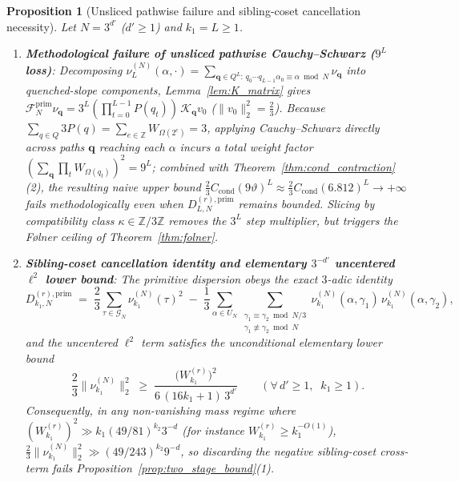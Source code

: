 \documentclass[11pt,a4paper]{article}
\numberwithin{equation}{section}
\newtheorem{proposition}[theorem]{Proposition}
\theoremstyle{definition}
\theoremstyle{remark}
\newcommand{\Z}{\mathbb{Z}}
\newcommand{\cG}{\mathcal{G}}
\newcommand{\cF}{\mathcal{F}}
\newcommand{\cK}{\mathcal{K}}
\newcommand{\prim}{\mathrm{prim}}
\begin{document}
\begin{proposition}[Unsliced pathwise failure and sibling-coset cancellation necessity]\label{prop:unsliced_sibling}
Let $N = 3^{d'}$ ($d' \ge 1$) and $k_1 = L \ge 1$.
\begin{enumerate}[label=(\arabic*)]
\item \textbf{Methodological failure of unsliced pathwise Cauchy--Schwarz ($9^L$ loss)}: Decomposing $\nu_L^{(N)}(\alpha, \cdot) = \sum_{\boldsymbol{q}\in Q^L:\, q_0\cdots q_{L-1}\alpha_0 \equiv \alpha \bmod N} \nu_{\boldsymbol{q}}$ into quenched-slope components, Lemma~\ref{lem:K_matrix} gives $\cF_N^{\prim}\nu_{\boldsymbol{q}} = 3^L(\prod_{t=0}^{L-1} P(q_t))\,\cK_{\boldsymbol{q}} v_0$ ($\|v_0\|_2^2 = \frac{2}{3}$). Because $\sum_{q \in Q} 3 P(q) = \sum_{e \in \Z} W_{\Omega(2^e)} = 3$, applying Cauchy--Schwarz directly across paths $\boldsymbol{q}$ reaching each $\alpha$ incurs a total weight factor $(\sum_{\boldsymbol{q}} \prod_t W_{\Omega(q_t)})^2 = 9^L$; combined with Theorem~\ref{thm:cond_contraction}(2), the resulting naive upper bound $\frac{2}{3} C_{\mathrm{cond}}(9\vartheta)^L \approx \frac{2}{3} C_{\mathrm{cond}}(6.812)^L \to +\infty$ fails methodologically even when $D_{L, N}^{(r), \prim}$ remains bounded. Slicing by compatibility class $\kappa \in \Z/3\Z$ removes the $3^L$ step multiplier, but triggers the F{\o}lner ceiling of Theorem~\ref{thm:folner}.
\item \textbf{Sibling-coset cancellation identity and elementary $3^{-d'}$ uncentered $\ell^2$ lower bound}: The primitive dispersion obeys the exact $3$-adic identity
\[
D_{k_1, N}^{(r), \prim} \;=\; \frac{2}{3}\sum_{\tau \in \cG_N} \nu_{k_1}^{(N)}(\tau)^2 \;-\; \frac{1}{3}\sum_{\alpha \in U_N}\sum_{\substack{\gamma_1 \equiv \gamma_2 \bmod N/3 \\ \gamma_1 \not\equiv \gamma_2 \bmod N}} \nu_{k_1}^{(N)}(\alpha, \gamma_1)\,\nu_{k_1}^{(N)}(\alpha, \gamma_2),
\]
and the uncentered $\ell^2$ term satisfies the unconditional elementary lower bound
\[
\frac{2}{3}\bigl\|\nu_{k_1}^{(N)}\bigr\|_2^2 \;\ge\; \frac{\bigl(W_{k_1}^{(r)}\bigr)^2}{6\,(16 k_1 + 1)\, 3^{d'}} \qquad (\forall\, d' \ge 1,\;\; k_1 \ge 1).
\]
Consequently, in any non-vanishing mass regime where $(W_{k_1}^{(r)})^2 \gg k_1 (49/81)^{k_2} 3^{-d}$ (for instance $W_{k_1}^{(r)} \ge k_1^{-O(1)}$), $\frac{2}{3}\|\nu_{k_1}^{(N)}\|_2^2 \gg (49/243)^{k_2} 9^{-d}$, so discarding the negative sibling-coset cross-term fails Proposition~\ref{prop:two_stage_bound}(1).
\end{enumerate}
\end{proposition}
\end{document}
